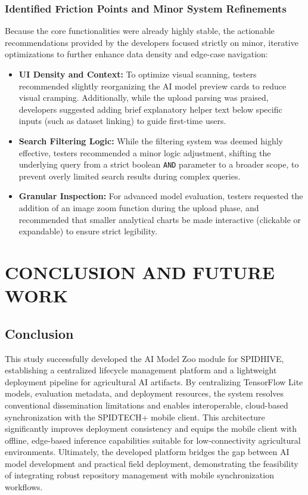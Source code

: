\documentclass{icsthesis}
\begin{document}
\begin{mainmatter}
            \subsubsection{\textbf{Identified Friction Points and Minor System Refinements}}
            Because the core functionalities were already highly stable, the actionable recommendations provided by the developers focused strictly on minor, iterative optimizations to further enhance data density and edge-case navigation:
            \begin{itemize}
                \item \textbf{UI Density and Context:}
                To optimize visual scanning, testers recommended slightly reorganizing the AI model preview cards to reduce visual cramping. Additionally, while the upload parsing was praised, developers suggested adding brief explanatory helper text below specific inputs (such as dataset linking) to guide first-time users.
                \item \textbf{Search Filtering Logic:}
                While the filtering system was deemed highly effective, testers recommended a minor logic adjustment, shifting the underlying query from a strict boolean \texttt{AND} parameter to a broader scope, to prevent overly limited search results during complex queries.
                \item \textbf{Granular Inspection:}
                For advanced model evaluation, testers requested the addition of an image zoom function during the upload phase, and recommended that smaller analytical charts be made interactive (clickable or expandable) to ensure strict legibility.
            \end{itemize}

        \section{CONCLUSION AND FUTURE WORK}
            \subsection{Conclusion}
            This study successfully developed the AI Model Zoo module for SPIDHIVE, establishing a centralized lifecycle management platform and a lightweight deployment pipeline for agricultural AI artifacts. By centralizing TensorFlow Lite models, evaluation metadata, and deployment resources, the system resolves conventional dissemination limitations and enables interoperable, cloud-based synchronization with the SPIDTECH+ mobile client. This architecture significantly improves deployment consistency and equips the mobile client with offline, edge-based inference capabilities suitable for low-connectivity agricultural environments. Ultimately, the developed platform bridges the gap between AI model development and practical field deployment, demonstrating the feasibility of integrating robust repository management with mobile synchronization workflows.
            

\end{mainmatter}
\end{document}
